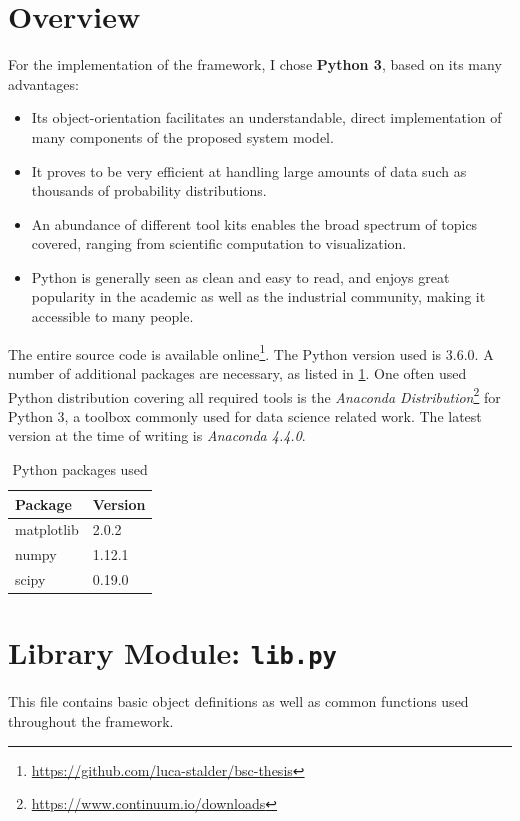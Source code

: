 \documentclass[a4paper,oneside]{csthesis}
\begin{document}
\section{Overview}
\label{sec:framework-overview}
For the implementation of the framework, I chose \textbf{Python 3}, based on its many advantages:
\begin{itemize}
    \item Its object-orientation facilitates an understandable, direct implementation of many components of the proposed system model.
    \item It proves to be very efficient at handling large amounts of data such as thousands of probability distributions.
    \item An abundance of different tool kits enables the broad spectrum of topics covered, ranging from scientific computation to visualization.
    \item Python is generally seen as clean and easy to read, and enjoys great popularity in the academic as well as the industrial community, making it accessible to many people.
\end{itemize}
The entire source code is available online\footnote{\url{https://github.com/luca-stalder/bsc-thesis}}. The Python version used is 3.6.0. A number of additional packages are necessary, as listed in \cref{py-packages}. One often used Python distribution covering all required tools is the \textit{Anaconda Distribution}\footnote{\url{https://www.continuum.io/downloads}} for Python 3, a toolbox commonly used for data science related work. The latest version at the time of writing is \textit{Anaconda 4.4.0}.

\begin{table}[ht]
    \centering
    \caption{Python packages used}
    \label{py-packages}
    \begin{tabular}{@{}ll@{}}
        \toprule
        Package & Version \\
        \midrule
        matplotlib & 2.0.2 \\
        numpy & 1.12.1 \\
        scipy & 0.19.0 \\
    \end{tabular}
\end{table}

\section{Library Module: \texttt{lib.py}}
This file contains basic object definitions as well as common functions used throughout the framework.
\end{document}
